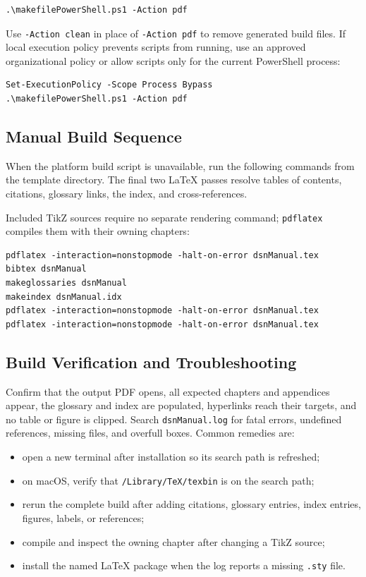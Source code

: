 \begin{verbatim}
.\makefilePowerShell.ps1 -Action pdf
\end{verbatim}

Use \texttt{-Action clean} in place of \texttt{-Action pdf} to remove generated build files. If local execution policy prevents scripts from running, use an approved organizational policy or allow scripts only for the current PowerShell process:

\begin{verbatim}
Set-ExecutionPolicy -Scope Process Bypass
.\makefilePowerShell.ps1 -Action pdf
\end{verbatim}

\subsection{Manual Build Sequence}

When the platform build script is unavailable, run the following commands from
the template directory. The final two LaTeX passes resolve tables of contents,
citations, glossary links, the index, and cross-references.

Included TikZ sources require no separate rendering command; \texttt{pdflatex}
compiles them with their owning chapters:

\begin{verbatim}
pdflatex -interaction=nonstopmode -halt-on-error dsnManual.tex
bibtex dsnManual
makeglossaries dsnManual
makeindex dsnManual.idx
pdflatex -interaction=nonstopmode -halt-on-error dsnManual.tex
pdflatex -interaction=nonstopmode -halt-on-error dsnManual.tex
\end{verbatim}

\subsection{Build Verification and Troubleshooting}

Confirm that the output PDF opens, all expected chapters and appendices appear,
the glossary and index are populated, hyperlinks reach their targets, and no
table or figure is clipped. Search \texttt{dsnManual.log} for fatal errors,
undefined references, missing files, and overfull boxes. Common remedies are:

\begin{itemize}
\item open a new terminal after installation so its search path is refreshed;
\item on macOS, verify that \texttt{/Library/TeX/texbin} is on the search path;
\item rerun the complete build after adding citations, glossary entries, index
entries, figures, labels, or references;
\item compile and inspect the owning chapter after changing a TikZ source;
\item install the named LaTeX package when the log reports a missing
\texttt{.sty} file.
\end{itemize}

